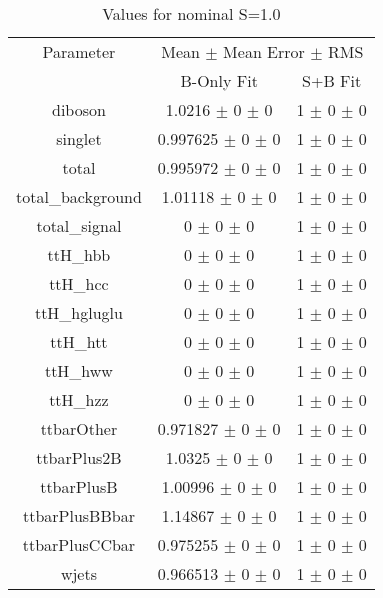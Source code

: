 \begin{table}
\centering
\caption{Values for nominal S=1.0}
\begin{tabular}{ccc}
\toprule
Parameter 	& \multicolumn{2}{c}{Mean $\pm$ Mean Error $\pm$ RMS}\\
 	& B-Only Fit & S+B Fit\\
\midrule
diboson 	& \num{1.0216} $\pm$ \num{0} $\pm$ \num{0} 	& \num{1} $\pm$ \num{0} $\pm$ \num{0}\\
singlet 	& \num{0.997625} $\pm$ \num{0} $\pm$ \num{0} 	& \num{1} $\pm$ \num{0} $\pm$ \num{0}\\
total 	& \num{0.995972} $\pm$ \num{0} $\pm$ \num{0} 	& \num{1} $\pm$ \num{0} $\pm$ \num{0}\\
total\_background 	& \num{1.01118} $\pm$ \num{0} $\pm$ \num{0} 	& \num{1} $\pm$ \num{0} $\pm$ \num{0}\\
total\_signal 	& \num{0} $\pm$ \num{0} $\pm$ \num{0} 	& \num{1} $\pm$ \num{0} $\pm$ \num{0}\\
ttH\_hbb 	& \num{0} $\pm$ \num{0} $\pm$ \num{0} 	& \num{1} $\pm$ \num{0} $\pm$ \num{0}\\
ttH\_hcc 	& \num{0} $\pm$ \num{0} $\pm$ \num{0} 	& \num{1} $\pm$ \num{0} $\pm$ \num{0}\\
ttH\_hgluglu 	& \num{0} $\pm$ \num{0} $\pm$ \num{0} 	& \num{1} $\pm$ \num{0} $\pm$ \num{0}\\
ttH\_htt 	& \num{0} $\pm$ \num{0} $\pm$ \num{0} 	& \num{1} $\pm$ \num{0} $\pm$ \num{0}\\
ttH\_hww 	& \num{0} $\pm$ \num{0} $\pm$ \num{0} 	& \num{1} $\pm$ \num{0} $\pm$ \num{0}\\
ttH\_hzz 	& \num{0} $\pm$ \num{0} $\pm$ \num{0} 	& \num{1} $\pm$ \num{0} $\pm$ \num{0}\\
ttbarOther 	& \num{0.971827} $\pm$ \num{0} $\pm$ \num{0} 	& \num{1} $\pm$ \num{0} $\pm$ \num{0}\\
ttbarPlus2B 	& \num{1.0325} $\pm$ \num{0} $\pm$ \num{0} 	& \num{1} $\pm$ \num{0} $\pm$ \num{0}\\
ttbarPlusB 	& \num{1.00996} $\pm$ \num{0} $\pm$ \num{0} 	& \num{1} $\pm$ \num{0} $\pm$ \num{0}\\
ttbarPlusBBbar 	& \num{1.14867} $\pm$ \num{0} $\pm$ \num{0} 	& \num{1} $\pm$ \num{0} $\pm$ \num{0}\\
ttbarPlusCCbar 	& \num{0.975255} $\pm$ \num{0} $\pm$ \num{0} 	& \num{1} $\pm$ \num{0} $\pm$ \num{0}\\
wjets 	& \num{0.966513} $\pm$ \num{0} $\pm$ \num{0} 	& \num{1} $\pm$ \num{0} $\pm$ \num{0}\\
\bottomrule
\end{tabular}
\end{table}